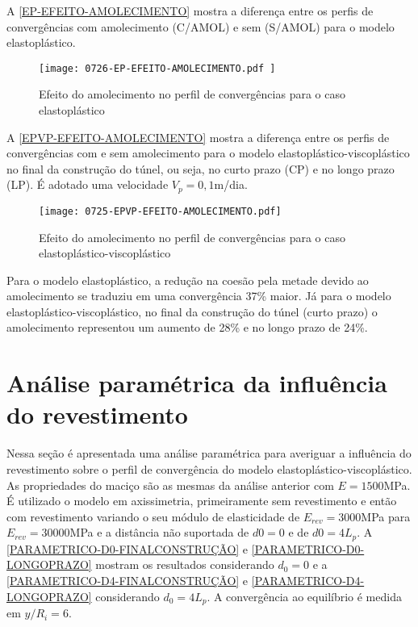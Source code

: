A \autoref{EP-EFEITO-AMOLECIMENTO} mostra a diferença entre os perfis de convergências com amolecimento (C/AMOL) e sem (S/AMOL) para o modelo elastoplástico.

\begin{figure}[H]
	\begin{center}
		\texttt{[image: 0726-EP-EFEITO-AMOLECIMENTO.pdf
		]}
	\end{center}
	\caption{\label{EP-EFEITO-AMOLECIMENTO}Efeito do amolecimento no perfil de convergências para o caso elastoplástico}
\end{figure}

A \autoref{EPVP-EFEITO-AMOLECIMENTO} mostra a diferença entre os perfis de convergências com e sem amolecimento para o modelo elastoplástico-viscoplástico no final da construção do túnel, ou seja, no curto prazo (CP) e no longo prazo (LP). É adotado uma velocidade $V_p=0,1$m/dia.

\begin{figure}[H]
	\begin{center}
		\texttt{[image: 0725-EPVP-EFEITO-AMOLECIMENTO.pdf]}
	\end{center}
	\caption{\label{EPVP-EFEITO-AMOLECIMENTO}Efeito do amolecimento no perfil de convergências para o caso elastoplástico-viscoplástico}
\end{figure}

Para o modelo elastoplástico, a redução na coesão pela metade devido ao amolecimento se traduziu em uma convergência 37\% maior. Já para o modelo elastoplástico-viscoplástico, no final da construção do túnel (curto prazo) o amolecimento representou um aumento de 28\% e no longo prazo de 24\%.


\section{Análise paramétrica da influência do revestimento}

Nessa seção é apresentada uma análise paramétrica para averiguar a influência do revestimento sobre o perfil de convergência do modelo elastoplástico-viscoplástico. As propriedades do maciço são as mesmas da análise anterior com $E=1500$MPa. É utilizado o modelo em axissimetria, primeiramente sem revestimento e então com revestimento variando o seu módulo de elasticidade de $E_{rev} = 3000$MPa para $E_{rev} = 30000$MPa e a distância não suportada de $d0 = 0$ e de $d0 = 4L_p$. A \autoref{PARAMETRICO-D0-FINALCONSTRUÇÃO} e \autoref{PARAMETRICO-D0-LONGOPRAZO} mostram os resultados considerando $d_0 = 0$ e a \autoref{PARAMETRICO-D4-FINALCONSTRUÇÃO} e \autoref{PARAMETRICO-D4-LONGOPRAZO} considerando $d_0=4L_p$. A convergência ao equilíbrio é medida em $y/R_i = 6$. 

